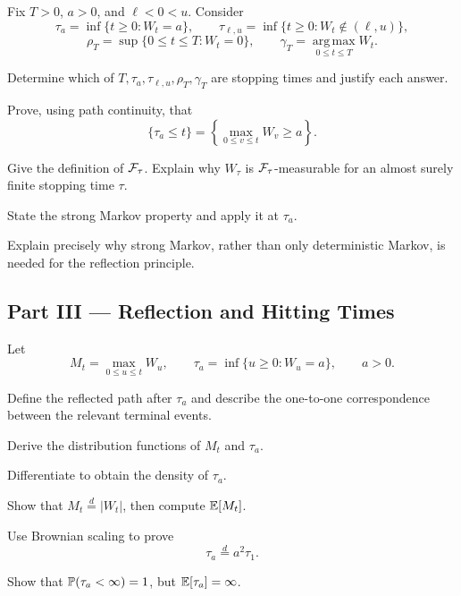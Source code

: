 \begin{exercise}
Fix \(T>0\), \(a>0\), and \(\ell<0<u\). Consider
\[
\tau_a=\inf\{t\geq0:W_t=a\},
\qquad
\tau_{\ell,u}=\inf\{t\geq0:W_t\notin(\ell,u)\},
\]
\[
\rho_T=\sup\{0\leq t\leq T:W_t=0\},
\qquad
\gamma_T=\operatorname*{arg\,max}_{0\leq t\leq T}W_t.
\]
\begin{exparts}
  \item Determine which of \(T,\tau_a,\tau_{\ell,u},\rho_T,\gamma_T\)
  are stopping times and justify each answer.
  \item Prove, using path continuity, that
  \[
  \{\tau_a\leq t\}
  =\left\{\max_{0\leq v\leq t}W_v\geq a\right\}.
  \]
  \item Give the definition of \(\mathcal{F}_\tau\). Explain why \(W_\tau\) is
  \(\mathcal{F}_\tau\)-measurable for an almost surely finite stopping time \(\tau\).
  \item State the strong Markov property and apply it at \(\tau_a\).
  \item Explain precisely why strong Markov, rather than only deterministic
  Markov, is needed for the reflection principle.
\end{exparts}
\end{exercise}

\subsection*{Part III --- Reflection and Hitting Times}

\begin{exercise}
Let
\[
M_t=\max_{0\leq u\leq t}W_u,
\qquad
\tau_a=\inf\{u\geq0:W_u=a\},
\qquad a>0.
\]
\begin{exparts}
  \item Define the reflected path after \(\tau_a\) and describe the
  one-to-one correspondence between the relevant terminal events.
  \item Derive the distribution functions of \(M_t\) and \(\tau_a\).
  \item Differentiate to obtain the density of \(\tau_a\).
  \item Show that \(M_t\overset{d}=|W_t|\), then compute \(\mathbb{E}[M_t]\).
  \item Use Brownian scaling to prove
  \[
  \tau_a\overset{d}=a^2\tau_1.
  \]
  \item Show that \(\mathbb{P}(\tau_a<\infty)=1\), but
  \(\mathbb{E}[\tau_a]=\infty\).
\end{exparts}
\end{exercise}


